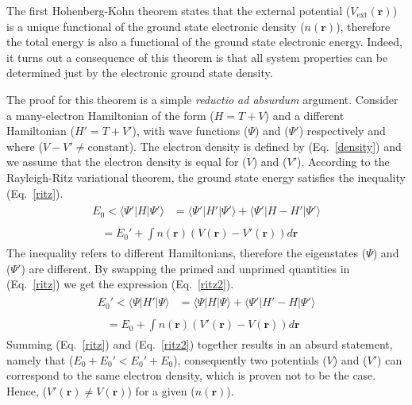 The first Hohenberg-Kohn theorem states that the external potential ($V_{\mathrm{ext}}(\mathbf{r})$) is a unique functional of the ground state electronic density ($n(\mathbf{r})$), therefore the total energy is also a functional of the ground state electronic energy. Indeed, it turns out a consequence of this theorem is that all system properties can be determined just by the electronic ground state density.\cite{hohkohn} 

The proof for this theorem is a simple \textit{reductio ad absurdum} argument. Consider a many-electron Hamiltonian of the form ($H = T + V$) and a different Hamiltonian ($H' = T + V'$), with wave functions ($\Psi$) and ($\Psi '$) respectively and where ($V - V' \neq \mathrm{constant}$). The electron density is defined by (Eq.~\ref{density}) and we assume that the electron density is equal for ($V$) and ($V'$). 
%
According to the Rayleigh-Ritz variational theorem, the ground state energy satisfies the inequality (Eq.~\ref{ritz}).
%
\begin{subequations} \label{ritz}
\begin{align}
\begin{split}
E_0 < \langle \Psi'|H|\Psi'\rangle &= \langle \Psi'|H'|\Psi'\rangle + \langle \Psi'|H-H'|\Psi'\rangle
\end{split}\\
\begin{split}
&= E_0 ' + \int n(\mathbf{r}) (V(\mathbf{r}) - V'(\mathbf{r})) d \mathbf{r}
\end{split}
\end{align}
\end{subequations}
%
The inequality refers to different Hamiltonians, therefore the eigenstates ($\Psi$) and ($\Psi '$) are different. By swapping the primed and unprimed quantities in (Eq.~\ref{ritz}) we get the expression (Eq.~\ref{ritz2}).
%
\begin{subequations} \label{ritz2}
\begin{align}
\begin{split}
E_0' < \langle \Psi|H'|\Psi\rangle &= \langle \Psi|H|\Psi\rangle + \langle \Psi'|H'-H|\Psi'\rangle
\end{split}\\
\begin{split}
&= E_0 + \int n(\mathbf{r}) (V'(\mathbf{r}) - V(\mathbf{r})) d \mathbf{r}
\end{split}
\end{align}
\end{subequations}
%
Summing (Eq.~\ref{ritz}) and (Eq.~\ref{ritz2}) together results in an absurd statement, namely that ($E_0 + E_0 ' < E_0' + E_0$), consequently two potentials ($V$) and ($V'$) can correspond to the same electron density, which is proven not to be the case. Hence, ($V'(\mathbf{r}) \neq V(\mathbf{r})$) for a given ($n(\mathbf{r})$).
%


